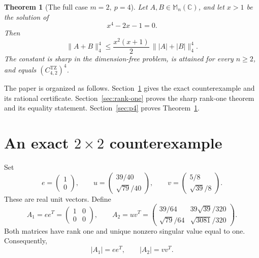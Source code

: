 \documentclass[11pt,reqno]{amsart}
\newtheorem{theorem}{Theorem}[section]
\theoremstyle{remark}
\newcommand{\C}{\mathbb C}
\newcommand{\M}{\mathbb M}
\newcommand{\TZ}{C^{\mathrm{TZ}}}
\begin{document}
\begin{theorem}[The full case \(m=2,\ p=4\)]\label{thm:p4}
Let \(A,B\in\M_n(\C)\), and let \(x>1\) be the solution of
\[
 x^4-2x-1=0.
\]
Then
\begin{equation}\label{eq:p4-bound}
 \|A+B\|_4^4
 \le
 \frac{x^2(x+1)}2\,\||A|+|B|\|_4^4.
\end{equation}
The constant is sharp in the dimension-free problem, is attained for every
\(n\ge2\), and equals \((\TZ_{4,2})^4\).
\end{theorem}

The paper is organized as follows.  Section~\ref{sec:counterexample} gives
the exact counterexample and its rational certificate.
Section~\ref{sec:rank-one} proves the sharp rank-one theorem and its equality
statement.  Section~\ref{sec:p4} proves Theorem~\ref{thm:p4}.

\section{An exact \texorpdfstring{\(2\times2\)}{2-by-2} counterexample}
\label{sec:counterexample}

Set
\[
 e=\begin{pmatrix}1\\0\end{pmatrix},\qquad
 u=\begin{pmatrix}39/40\\ \sqrt{79}/40\end{pmatrix},\qquad
 v=\begin{pmatrix}5/8\\ \sqrt{39}/8\end{pmatrix}.
\]
These are real unit vectors.  Define
\begin{equation}\label{eq:counterexample-matrices}
 A_1=ee^T=
 \begin{pmatrix}1&0\\0&0\end{pmatrix},\qquad
 A_2=uv^T=
 \begin{pmatrix}
 39/64&39\sqrt{39}/320\\[1mm]
 \sqrt{79}/64&\sqrt{3081}/320
 \end{pmatrix}.
\end{equation}
Both matrices have rank one and unique nonzero singular value equal to one.
Consequently,
\[
 |A_1|=ee^T,\qquad |A_2|=vv^T.
\]
\end{document}
